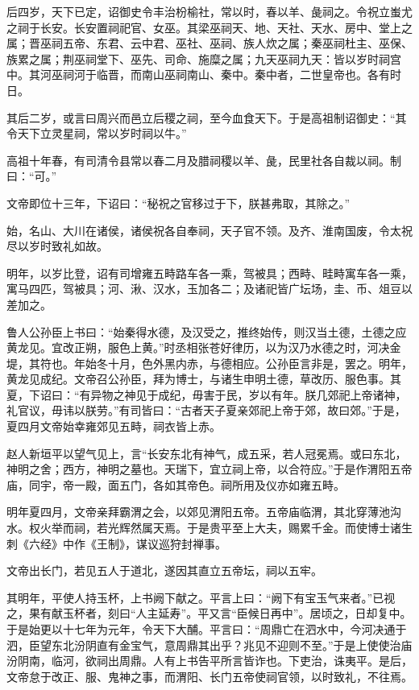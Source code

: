 \documentclass[]{article}
\begin{document}
后四岁，天下已定，诏御史令丰治枌榆社，常以时，春以羊、彘祠之。令祝立蚩尤之祠于长安。长安置祠祀官、女巫。其梁巫祠天、地、天社、天水、房中、堂上之属；晋巫祠五帝、东君、云中君、巫社、巫祠、族人炊之属；秦巫祠杜主、巫保、族累之属；荆巫祠堂下、巫先、司命、施糜之属；九天巫祠九天：皆以岁时祠宫中。其河巫祠河于临晋，而南山巫祠南山、秦中。秦中者，二世皇帝也。各有时日。

其后二岁，或言曰周兴而邑立后稷之祠，至今血食天下。于是高祖制诏御史：``其令天下立灵星祠，常以岁时祠以牛。''

高祖十年春，有司清令县常以春二月及腊祠稷以羊、彘，民里社各自裁以祠。制曰：``可。''

文帝即位十三年，下诏曰：``秘祝之官移过于下，朕甚弗取，其除之。''

始，名山、大川在诸侯，诸侯祝各自奉祠，天子官不领。及齐、淮南国废，令太祝尽以岁时致礼如故。

明年，以岁比登，诏有司增雍五畤路车各一乘，驾被具；西畤、畦畤寓车各一乘，寓马四匹，驾被具；河、湫、汉水，玉加各二；及诸祀皆广坛场，圭、币、俎豆以差加之。

鲁人公孙臣上书曰：``始秦得水德，及汉受之，推终始传，则汉当土德，土德之应黄龙见。宜改正朔，服色上黄。''时丞相张苍好律历，以为汉乃水德之时，河决金堤，其符也。年始冬十月，色外黑内赤，与德相应。公孙臣言非是，罢之。明年，黄龙见成纪。文帝召公孙臣，拜为博士，与诸生申明土德，草改历、服色事。其夏，下诏曰：``有异物之神见于成纪，毋害于民，岁以有年。朕几郊祀上帝诸神，礼官议，毋讳以朕劳。''有司皆曰：``古者天子夏亲郊祀上帝于郊，故曰郊。''于是，夏四月文帝始幸雍郊见五畤，祠衣皆上赤。

赵人新垣平以望气见上，言``长安东北有神气，成五采，若人冠冕焉。或曰东北，神明之舍；西方，神明之墓也。天瑞下，宜立祠上帝，以合符应。''于是作渭阳五帝庙，同宇，帝一殿，面五门，各如其帝色。祠所用及仪亦如雍五畤。

明年夏四月，文帝亲拜霸渭之会，以郊见渭阳五帝。五帝庙临渭，其北穿薄池沟水。权火举而祠，若光辉然属天焉。于是贵平至上大夫，赐累千金。而使博士诸生刺《六经》中作《王制》，谋议巡狩封禅事。

文帝出长门，若见五人于道北，遂因其直立五帝坛，祠以五牢。

其明年，平使人持玉杯，上书阙下献之。平言上曰：``阙下有宝玉气来者。''已视之，果有献玉杯者，刻曰``人主延寿''。平又言``臣候日再中''。居顷之，日却复中。于是始更以十七年为元年，令天下大酺。平言曰：``周鼎亡在泗水中，今河决通于泗，臣望东北汾阴直有金宝气，意周鼎其出乎？兆见不迎则不至。''于是上使使治庙汾阴南，临河，欲祠出周鼎。人有上书告平所言皆诈也。下吏治，诛夷平。是后，文帝怠于改正、服、鬼神之事，而渭阳、长门五帝使祠官领，以时致礼，不往焉。
\end{document}
